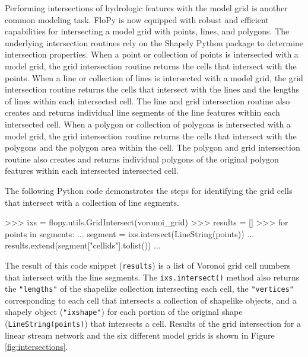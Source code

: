 \documentclass[12pt, oneside]{article}  	%
\begin{document}
Performing intersections of hydrologic features with the model grid is another common modeling task. FloPy is now equipped with robust and efficient capabilities for intersecting a model grid with points, lines, and polygons. The underlying intersection routines rely on the Shapely Python package \citep{shapely-gillies} to determine intersection properties. When a point or collection of points is intersected with a model grid, the grid intersection routine returns the cells that intersect with the points. When a line or collection of lines is intersected with a model grid, the grid intersection routine returns the cells that intersect with the lines and the lengths of lines within each intersected cell. The line and grid intersection routine also creates and returns individual line segments of the line features within each intersected cell. When a polygon or collection of polygons is intersected with a model grid, the grid intersection routine returns the cells that intersect with the polygons and the polygon area within the cell. The polygon and grid intersection routine also creates and returns individual polygons of the original polygon features within each intersected intersected cell.

The following Python code demonstrates the steps for identifying the grid cells that intersect with a collection of line segments.

\begin{python}
>>> ixs = flopy.utils.GridIntersect(voronoi_grid)
>>> results = []
>>> for points in segments:
...  segment = ixs.intersect(LineString(points))
...  results.extend(segment["cellids"].tolist())
...
\end{python}

\noindent The result of this code snippet (\texttt{results}) is a list of Voronoi grid cell numbers that intersect with the line segments. The \texttt{ixs.intersect()} method also returns the \texttt{"lengths"} of the shapelike collection intersecting each cell, the \texttt{"vertices"} corresponding to each cell that intersects a collection of shapelike objects, and a shapely object (\texttt{"ixshape"}) for each portion of the original shape (\texttt{LineString(points)}) that intersects a cell. Results of the grid intersection for a linear stream network and the six different model grids is shown in Figure \ref{fig:intersections}.
\end{document}
